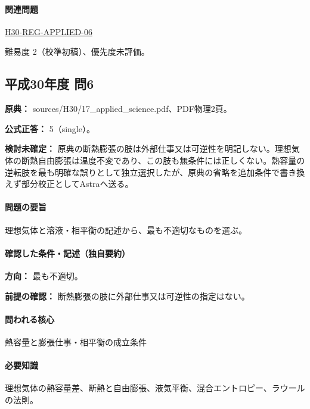 \paragraph{関連問題} \hyperref[q:h30-reg-applied-06]{H30-REG-APPLIED-06}

\par 難易度 2（校準初稿）、優先度未評価。

\subsection{平成30年度 問6}
\label{q:h30-reg-applied-06}

\noindent\textbf{原典：} sources/H30/17\_applied\_science.pdf、PDF物理2頁。

\textbf{公式正答：} 5（single）。

\par\textbf{検討未確定：} 原典の断熱膨張の肢は外部仕事又は可逆性を明記しない。理想気体の断熱自由膨張は温度不変であり、この肢も無条件には正しくない。熱容量の逆転肢を最も明確な誤りとして独立選択したが、原典の省略を追加条件で書き換えず部分校正としてAstraへ送る。

\paragraph{問題の要旨} 理想気体と溶液・相平衡の記述から、最も不適切なものを選ぶ。

\paragraph{確認した条件・記述（独自要約）}\mbox{}\par

\noindent\textbf{方向：} 最も不適切。\par

\noindent\textbf{前提の確認：} 断熱膨張の肢に外部仕事又は可逆性の指定はない。\par

\paragraph{問われる核心} 熱容量と膨張仕事・相平衡の成立条件

\paragraph{必要知識} 理想気体の熱容量差、断熱と自由膨張、液気平衡、混合エントロピー、ラウールの法則。

